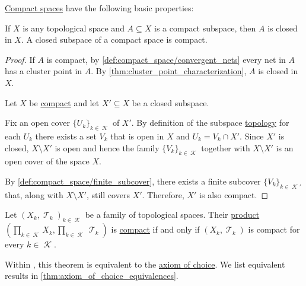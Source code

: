 \begin{proposition}\label{thm:def:compact_space}
  \hyperref[def:compact_space]{Compact spaces} have the following basic properties:
  \begin{thmenum}
     If \( X \) is any topological space and \( A \subseteq X \) is a compact subspace, then \( A \) is closed in \( X \).
     A closed subspace of a compact space is compact.
  \end{thmenum}
\end{proposition}
\begin{proof}
   If \( A \) is compact, by \cref{def:compact_space/convergent_nets} every net in \( A \) has a cluster point in \( A \). By \cref{thm:cluster_point_characterization}, \( A \) is closed in \( X \).

   Let \( X \) be \hyperref[def:compact_space]{compact} and let \( X' \subseteq X \) be a closed subspace.

  Fix an open cover \( \{ U_k \}_{k \in \mscrK} \) of \( X' \). By definition of the subspace \hyperref[def:topological_subspace]{topology} for each \( U_k \) there exists a set \( V_k \) that is open in \( X \) and \( U_k = V_k \cap X' \). Since \( X' \) is closed, \( X \setminus X' \) is open and hence the family \( \{ V_k \}_{k \in \mscrK} \) together with \( X \setminus X' \) is an open cover of the space \( X \).

  By \cref{def:compact_space/finite_subcover}, there exists a finite subcover \( \{ V_k \}_{k \in \mscrK'} \) that, along with \( X \setminus X' \), still covers \( X' \). Therefore, \( X' \) is also compact.
\end{proof}

\begin{theorem}\label{thm:tychonoffs_product_theorem}
  Let \( { (X_k, \mscrT_k) }_{k \in \mscrK} \) be a family of topological spaces. Their \hyperref[def:topological_product]{product} \( (\prod_{k \in \mscrK} X_k, \prod_{k \in \mscrK} \mscrT_k) \) is \hyperref[def:compact_space]{compact} if and only if \( (X_k, \mscrT_k) \) is compact for every \( k \in \mscrK \).
\end{theorem}
\begin{comments}
  \item Within \hyperref[def:zfc]{}, this theorem is equivalent to the \hyperref[def:zfc/choice]{axiom of choice}. We list equivalent results in \cref{thm:axiom_of_choice_equivalences}.
\end{comments}

